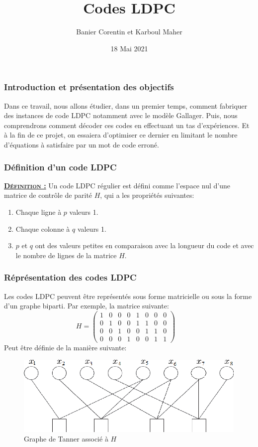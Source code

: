 \documentclass{beamer}
\title{Codes LDPC}
\author{Banier Corentin et Karboul Maher}
\institute{Université de Bordeaux}
\date{18 Mai 2021}
\begin{document}
	\begin{frame}
        \titlepage
	\end{frame}

    \begin{frame}
        \frametitle{Introduction et présentation des objectifs}
        Dans ce travail, nous allons étudier, dans un premier temps, comment fabriquer des instances de code LDPC notamment avec le modèle Gallager. Puis, nous comprendrons comment décoder ces codes en effectuant un tas d'expériences. Et à la fin de ce projet, on essaiera d'optimiser ce dernier en limitant le nombre d'équations à satisfaire par un mot de code erroné.
    \end{frame}

    \begin{frame}
        \frametitle{Définition d'un code LDPC}
        \textsc{\textbf{\underline{Définition :}}} Un code LDPC régulier est défini comme l'espace nul d'une matrice de contrôle de parité $H$, qui a les propriétés suivantes:
        \begin{enumerate}
            \item Chaque ligne à $p$ valeurs 1.
            \item Chaque colonne à $q$ valeurs 1.
            \item $p$ et $q$ ont des valeurs petites en comparaison avec la longueur du code et avec le nombre de lignes de la matrice $H$.
        \end{enumerate}
    \end{frame}

    \begin{frame}
        \frametitle{Réprésentation des codes LDPC}
        Les codes LDPC peuvent être représentés sous forme matricielle ou sous la forme d'un graphe biparti.
        \newline Par exemple, la matrice suivante:
        $$H=
        \begin{pmatrix}
            1 & 0 & 0 & 0 & 1 & 0 & 0 & 0 \\
            0 & 1 & 0 & 0 & 1 & 1 & 0 & 0 \\
            0 & 0 & 1 & 0 & 0 & 1 & 1 & 0 \\
            0 & 0 & 0 & 1 & 0 & 0 & 1 & 1 
        \end{pmatrix}
        \quad
        $$
        Peut être définie de la manière suivante:
        \begin{figure}[!h]
            \centering
            \includegraphics[scale=0.5]{Tanner2.png}  
            \caption{Graphe de Tanner associé à $H$}
            \label{fig:Tanner2}
        \end{figure}
    \end{frame}
\end{document}
